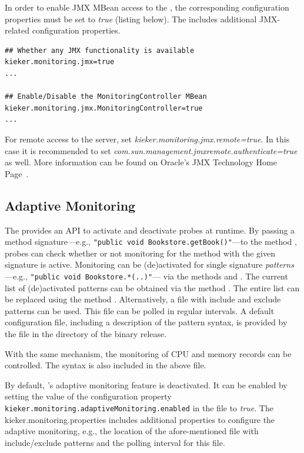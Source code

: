 In order to enable JMX MBean access to the , the corresponding configuration properties must be set to \textit{true} (listing below). %
The \file{\monitoringPropertiesFile} includes additional JMX-related configuration properties. \\

\setPropertiesListing
\begin{lstlisting}
## Whether any JMX functionality is available
kieker.monitoring.jmx=true
...

## Enable/Disable the MonitoringController MBean
kieker.monitoring.jmx.MonitoringController=true
...
\end{lstlisting}

For remote access to the server, set \textit{kieker.monitoring.jmx.remote=true}. In this case it is recommended to set \textit{com.sun.management.jmxremote.authenticate=true} as well. More information can be found on Oracle's JMX Technology Home Page~\cite{JMX-Website}.

\subsection{Adaptive Monitoring}

The  provides an API to activate and deactivate %
probes at runtime. By passing a method signature---e.g., %
\texttt{"public void Bookstore.getBook()"}---to the method %
, probes can check whether or not monitoring for the %
method with the given signature is active. %
Monitoring can be (de)activated for single signature \textit{patterns}---e.g., %
\texttt{"public void Bookstore.*(..)"}--- via the methods %
 and . The current list of %
(de)activated patterns can be obtained via the method . %
The entire list can be replaced using the method . %
Alternatively, a file with include and exclude patterns can be used. This file %
can be polled in regular intervals. %
A default configuration file, including a description of the pattern syntax, is provided %
by the file  in the %
 directory of the binary release. %

With the same mechanism, the monitoring of CPU and memory records can be controlled. %
The syntax is also included in the above file.

By default, \Kieker{}'s adaptive monitoring feature is deactivated. It can be %
enabled by setting the value of the configuration property %
\lstinline{kieker.monitoring.adaptiveMonitoring.enabled} %
in the \file{\monitoringPropertiesFile} file to \textit{true}. The %
kieker.monitoring.properties includes additional properties to configure the %
adaptive monitoring, e.g., the location of the afore-mentioned file with %
include/exclude patterns and the polling interval for this file. 

